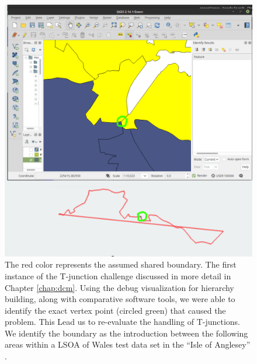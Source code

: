 \begin{figure}
\includegraphics[width=1\textwidth]{images/ch6/currentProblem}
\caption{The red color represents the assumed shared boundary. The first instance of the T-junction challenge discussed in more detail in Chapter \ref{chap:dcm}.  Using the debug visualization for hierarchy building, along with comparative software tools, we were able to identify the exact vertex point (circled green) that caused the problem. This Lead us to re-evaluate the handling of T-junctions. We identify the boundary as the introduction between the following areas within a LSOA of Wales test data set in the ``Isle of Anglesey'' \cite{wales}. }\label{fig:t-junction}
\end{figure} 
